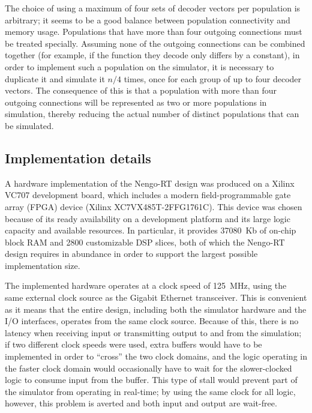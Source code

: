 \documentclass[english]{article}
\newcommand{\design}{Nengo-RT}
\begin{document}
The choice of using a maximum of four sets of decoder vectors per population is arbitrary; it seems to be a good balance between
population connectivity and memory usage. Populations that have more than four outgoing connections must be treated specially.
Assuming none of the outgoing connections can be combined together (for example, if the function they decode only differs by a constant),
in order to implement such a population on the simulator, it is necessary to duplicate it and simulate it
$n/4$ times, once for each group of up to four decoder vectors.
The consequence of this is that a population with more than
four outgoing connections will be represented as two or more populations in simulation, thereby reducing the actual number of
distinct populations that can be simulated.

\subsection{Implementation details}

A hardware implementation of the \design{} design was produced on a Xilinx VC707 development board, which includes a modern field-programmable gate array (FPGA)
device (Xilinx XC7VX485T-2FFG1761C). This device was chosen because of its ready availability on a development platform and its large logic capacity and available resources.
In particular, it provides 37080~Kb of on-chip block RAM and 2800 customizable DSP slices, both of which the Nengo-RT design requires in abundance in order to support
the largest possible implementation size. 


The implemented hardware operates at a clock speed of 125~MHz, using the same external clock source as the Gigabit Ethernet transceiver.
This is convenient as it means that the entire design, including both the simulator hardware and the I/O interfaces, operates from the same clock source.
Because of this, there is no latency when receiving input or transmitting output to and from the simulation;
if two different clock speeds were used, extra buffers would have to be implemented in order to ``cross'' the two clock domains,
and the logic operating in the faster clock domain would occasionally have to wait for the slower-clocked logic to consume input from the buffer.
This type of stall would prevent part of the simulator from operating in real-time; by using the same clock for all logic, however, this problem is averted and
both input and output are wait-free.
\end{document}
